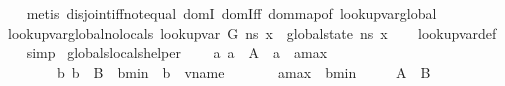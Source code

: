 \begin{isabellebody}
%
\isadelimproof
\ \ %
\endisadelimproof
%
\isatagproof
{}\isamarkupfalse%
\ {\isacharparenleft}{\kern0pt}metis\ disjoint{\isacharunderscore}{\kern0pt}iff{\isacharunderscore}{\kern0pt}not{\isacharunderscore}{\kern0pt}equal\ domI\ domIff\ dom{\isacharunderscore}{\kern0pt}map{\isacharunderscore}{\kern0pt}of{\isacharunderscore}{\kern0pt}{}\ lookup{\isacharunderscore}{\kern0pt}var{\isacharunderscore}{\kern0pt}global{\isacharparenright}{\kern0pt}%
\endisatagproof
{\isafoldproof}%
%
\isadelimproof
\isanewline
%
\endisadelimproof
\isanewline
{}\isamarkupfalse%
\ lookup{\isacharunderscore}{\kern0pt}var{\isacharunderscore}{\kern0pt}global{\isacharunderscore}{\kern0pt}no{\isacharunderscore}{\kern0pt}locals{\isacharcolon}{\kern0pt}\ {\isachardoublequoteopen}lookup{\isacharunderscore}{\kern0pt}var\ {\isacharparenleft}{\kern0pt}G{\isacharcomma}{\kern0pt}{\isacharbrackleft}{\kern0pt}{\isacharbrackright}{\kern0pt}{\isacharparenright}{\kern0pt}\ n{\isacharunderscore}{\kern0pt}s\ x\ {\isacharequal}{\kern0pt}\ global{\isacharunderscore}{\kern0pt}state\ n{\isacharunderscore}{\kern0pt}s\ x{\isachardoublequoteclose}\isanewline
%
\isadelimproof
\ \ %
\endisadelimproof
%
\isatagproof
{}\isamarkupfalse%
\ lookup{\isacharunderscore}{\kern0pt}var{\isacharunderscore}{\kern0pt}def\isanewline
\ \ \isamarkupfalse%
\ simp%
\endisatagproof
{\isafoldproof}%
%
\isadelimproof
\isanewline
%
\endisadelimproof
\isanewline
{}\isamarkupfalse%
\ globals{\isacharunderscore}{\kern0pt}locals{\isacharunderscore}{\kern0pt}helper{\isacharcolon}{\kern0pt}\isanewline
\ \ \ {\isachardoublequoteopen}{\isasymforall}\ a{\isachardot}{\kern0pt}\ a\ {\isasymin}\ A\ {\isasymlongrightarrow}\ a\ {\isasymle}\ a{\isacharunderscore}{\kern0pt}max{\isachardoublequoteclose}\isanewline
\ \ \ \ \ \ \ {\isachardoublequoteopen}{\isasymforall}\ b{\isachardot}{\kern0pt}\ b\ {\isasymin}\ B\ {\isasymlongrightarrow}\ b{\isacharunderscore}{\kern0pt}min\ {\isasymle}\ {\isacharparenleft}{\kern0pt}b\ {\isacharcolon}{\kern0pt}{\isacharcolon}{\kern0pt}\ vname{\isacharparenright}{\kern0pt}{\isachardoublequoteclose}\isanewline
\ \ \ \ \ \ \ {\isachardoublequoteopen}a{\isacharunderscore}{\kern0pt}max\ {\isacharless}{\kern0pt}\ b{\isacharunderscore}{\kern0pt}min{\isachardoublequoteclose}\isanewline
\ \ \ \ \ {\isachardoublequoteopen}A\ {\isasyminter}\ B\ {\isacharequal}{\kern0pt}\ {\isacharbraceleft}{\kern0pt}{\isacharbraceright}{\kern0pt}{\isachardoublequoteclose}\isanewline

\end{isabellebody}
